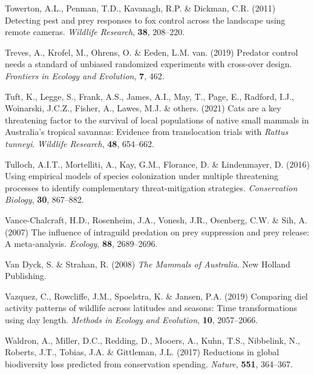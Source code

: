 \documentclass[11pt,a4paper,titlepage,twoside,openright]{style/unimelbthesis}
\begin{document}
\begin{mainmatter}
\leavevmode\hypertarget{ref-towerton2011detecting}{}%
Towerton, A.L., Penman, T.D., Kavanagh, R.P. \& Dickman, C.R. (2011) Detecting pest and prey responses to fox control across the landscape using remote cameras. \emph{Wildlife Research}, \textbf{38}, 208--220.

\leavevmode\hypertarget{ref-treves2019predator}{}%
Treves, A., Krofel, M., Ohrens, O. \& Eeden, L.M. van. (2019) Predator control needs a standard of unbiased randomized experiments with cross-over design. \emph{Frontiers in Ecology and Evolution}, \textbf{7}, 462.

\leavevmode\hypertarget{ref-tuft2021cats}{}%
Tuft, K., Legge, S., Frank, A.S., James, A.I., May, T., Page, E., Radford, I.J., Woinarski, J.C.Z., Fisher, A., Lawes, M.J. \& others. (2021) Cats are a key threatening factor to the survival of local populations of native small mammals in Australia's tropical savannas: Evidence from translocation trials with \emph{Rattus tunneyi}. \emph{Wildlife Research}, \textbf{48}, 654--662.

\leavevmode\hypertarget{ref-tulloch2016using}{}%
Tulloch, A.I.T., Mortelliti, A., Kay, G.M., Florance, D. \& Lindenmayer, D. (2016) Using empirical models of species colonization under multiple threatening processes to identify complementary threat-mitigation strategies. \emph{Conservation Biology}, \textbf{30}, 867--882.

\leavevmode\hypertarget{ref-vance2007influence}{}%
Vance-Chalcraft, H.D., Rosenheim, J.A., Vonesh, J.R., Osenberg, C.W. \& Sih, A. (2007) The influence of intraguild predation on prey suppression and prey release: A meta-analysis. \emph{Ecology}, \textbf{88}, 2689--2696.

\leavevmode\hypertarget{ref-van2008mammals}{}%
Van Dyck, S. \& Strahan, R. (2008) \emph{The Mammals of Australia}. New Holland Publishing.

\leavevmode\hypertarget{ref-vazquez2019comparing}{}%
Vazquez, C., Rowcliffe, J.M., Spoelstra, K. \& Jansen, P.A. (2019) Comparing diel activity patterns of wildlife across latitudes and seasons: Time transformations using day length. \emph{Methods in Ecology and Evolution}, \textbf{10}, 2057--2066.

\leavevmode\hypertarget{ref-waldron2017reductions}{}%
Waldron, A., Miller, D.C., Redding, D., Mooers, A., Kuhn, T.S., Nibbelink, N., Roberts, J.T., Tobias, J.A. \& Gittleman, J.L. (2017) Reductions in global biodiversity loss predicted from conservation spending. \emph{Nature}, \textbf{551}, 364--367.


\end{mainmatter}
\end{document}
